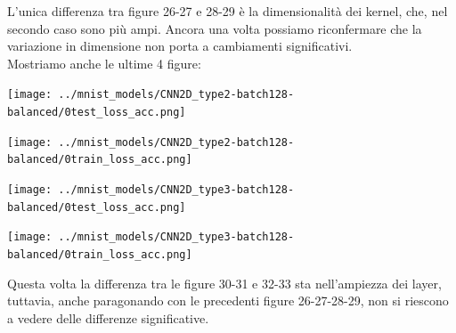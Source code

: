 \documentclass[12pt]{article}
\begin{document}
L'unica differenza tra figure 26-27 e 28-29 è la dimensionalità dei kernel, che, nel
secondo caso sono più ampi. Ancora una volta possiamo riconfermare che la variazione
in dimensione non porta a cambiamenti significativi.\\


Mostriamo anche le ultime 4 figure:\newpage

\begin{multicols}{2}
    \noindent
    \begin{minipage}{\linewidth}
        \centering
        \texttt{[image: ../mnist\_models/CNN2D\_type2-batch128-balanced/0test\_loss\_acc.png]}
        \label{fig:cc}
    \end{minipage}
    \bigskip

    \noindent
    \begin{minipage}{\linewidth}
        \centering
        \texttt{[image: ../mnist\_models/CNN2D\_type2-batch128-balanced/0train\_loss\_acc.png]}
        \label{fig:cc}
    \end{minipage}
    \bigskip
\end{multicols}

\begin{multicols}{2}
    \noindent
    \begin{minipage}{\linewidth}
        \centering
        \texttt{[image: ../mnist\_models/CNN2D\_type3-batch128-balanced/0test\_loss\_acc.png]}
        \label{fig:cc}
    \end{minipage}
    \bigskip

    \noindent
    \begin{minipage}{\linewidth}
        \centering
        \texttt{[image: ../mnist\_models/CNN2D\_type3-batch128-balanced/0train\_loss\_acc.png]}
        \label{fig:cc}
    \end{minipage}
    \bigskip
\end{multicols}


Questa volta la differenza tra le figure 30-31 e 32-33 sta nell'ampiezza dei layer,
tuttavia, anche paragonando con le precedenti figure 26-27-28-29, non si riescono
a vedere delle differenze significative.

\end{document}
